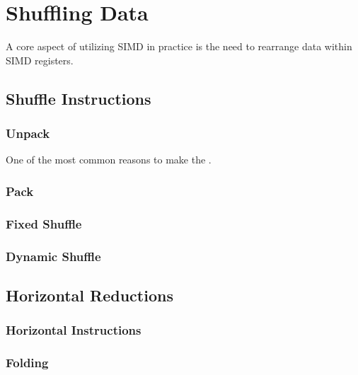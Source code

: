 \chapter{Shuffling Data}
A core aspect of utilizing SIMD in practice is the need to rearrange data within
SIMD registers.

\section{Shuffle Instructions}
\subsection{Unpack}
One of the most common reasons to make the .

\subsection{Pack}
\subsection{Fixed Shuffle}
\subsection{Dynamic Shuffle}

\section{Horizontal Reductions}

\subsection{Horizontal Instructions}

\subsection{Folding}
